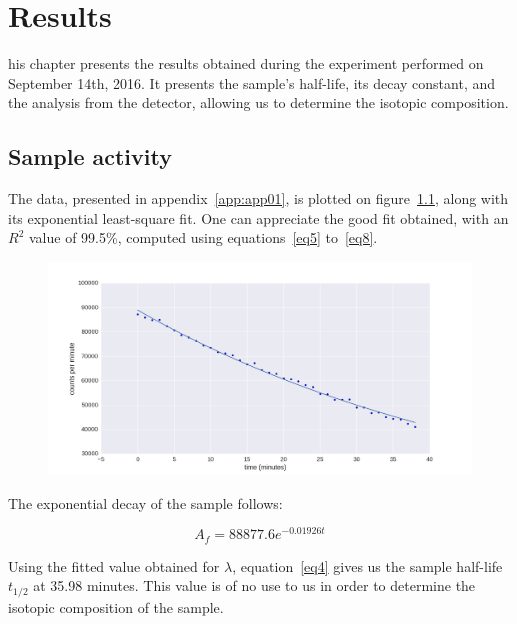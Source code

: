 %
%
\let\textcircled=\pgftextcircled
\chapter{Results}
\label{chap:result}

his chapter presents the results obtained during the experiment performed on September 14th, 2016. It presents the sample's half-life, its decay constant, and the analysis from the detector, allowing us to determine the isotopic composition.

\section{Sample activity}

The data, presented in appendix~\ref{app:app01}, is plotted on figure~\ref{fig:actsample}, along with its exponential least-square fit. One can appreciate the good fit obtained, with an $R^2$ value of 99.5\%, computed using equations~\ref{eq5} to~\ref{eq8}.

\begin{figure}[t!]
	\centering
	\includegraphics[height=0.4\textheight]{fig02/plot.png}
	\label{fig:actsample}
\end{figure}

The exponential decay of the sample follows:

\begin{equation}\label{eq9}
{A_f} = 88877.6 e^{-0.01926 t}
\end{equation}

Using the fitted value obtained for $\lambda$, equation~\ref{eq4} gives us the sample half-life $t_{1/2}$ at 35.98 minutes. This value is of no use to us in order to determine the isotopic composition of the sample.

